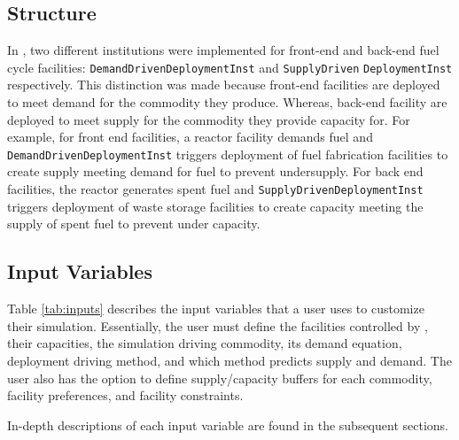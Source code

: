 \subsection{Structure}
In \deploy, two different institutions were implemented for 
front-end and back-end fuel cycle facilities: 
\texttt{DemandDrivenDeploymentInst} and 
\texttt{SupplyDriven} 
\noindent
\texttt{DeploymentInst} respectively. 
This distinction was made because front-end facilities 
are deployed to meet demand for the commodity they produce. 
Whereas, back-end facility are deployed to meet supply for the 
commodity they provide capacity for. 
For example, for front end facilities, a reactor facility 
demands fuel and \texttt{DemandDrivenDeploymentInst} 
triggers deployment of fuel fabrication facilities to create 
supply meeting demand for fuel to prevent undersupply. 
For back end facilities, the reactor generates spent fuel and 
\texttt{SupplyDrivenDeploymentInst} triggers deployment of 
waste storage facilities to create capacity meeting the supply 
of spent fuel to prevent under capacity. 

\subsection{Input Variables}
Table \ref{tab:inputs} describes the input variables that a user 
uses to customize their simulation. 
Essentially, the user must define the facilities controlled by 
\deploy, their capacities, the simulation driving commodity, 
its demand equation, deployment driving method, and which method
predicts supply and demand. 
The user also has the option to define supply/capacity buffers for 
each commodity, facility preferences, and facility constraints. 

In-depth descriptions of each input variable are found in the 
subsequent sections. 


